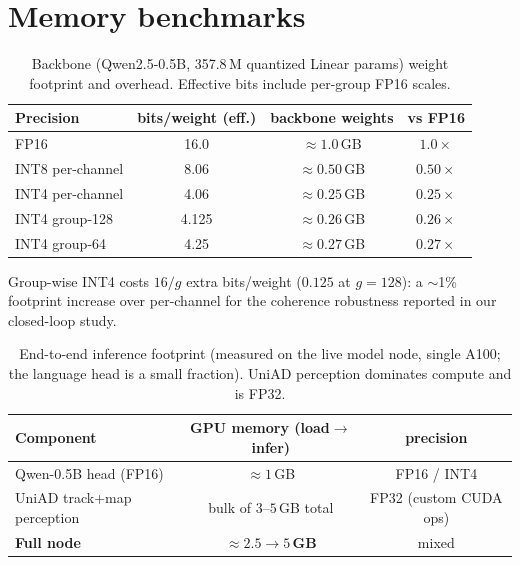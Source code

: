 \documentclass[conference]{IEEEtran}
\begin{document}
\section{Memory benchmarks}
\begin{table}[t]\centering
\caption{Backbone (Qwen2.5-0.5B, 357.8\,M quantized Linear params) weight footprint and overhead.
Effective bits include per-group FP16 scales.}
\begin{tabular}{lccc}
\toprule
Precision & bits/weight (eff.) & backbone weights & vs FP16 \\
\midrule
FP16              & 16.0   & $\approx 1.0$\,GB  & $1.0\times$ \\
INT8 per-channel  & 8.06   & $\approx 0.50$\,GB & $0.50\times$ \\
INT4 per-channel  & 4.06   & $\approx 0.25$\,GB & $0.25\times$ \\
INT4 group-128    & 4.125  & $\approx 0.26$\,GB & $0.26\times$ \\
INT4 group-64     & 4.25   & $\approx 0.27$\,GB & $0.27\times$ \\
\bottomrule
\end{tabular}
\end{table}
Group-wise INT4 costs $16/g$ extra bits/weight ($0.125$ at $g{=}128$): a $\sim$1\% footprint
increase over per-channel for the coherence robustness reported in our closed-loop study.

\begin{table}[t]\centering
\caption{End-to-end inference footprint (measured on the live model node, single A100; the
language head is a small fraction). UniAD perception dominates compute and is FP32.}
\begin{tabular}{lcc}
\toprule
Component & GPU memory (load$\to$infer) & precision \\
\midrule
Qwen-0.5B head (FP16)        & $\approx 1$\,GB             & FP16 / INT4 \\
UniAD track+map perception   & bulk of $3$--$5$\,GB total  & FP32 (custom CUDA ops) \\
\textbf{Full node}           & \textbf{$\approx 2.5\to 5$\,GB} & mixed \\
\bottomrule
\end{tabular}
\end{table}
\end{document}
